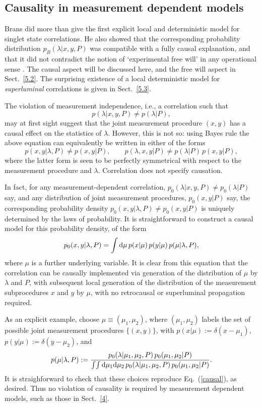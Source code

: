 \documentclass[graybox]{svmult}
\begin{document}
\subsection{Causality in measurement dependent models}
\label{5.1}

Brans did more than give the first explicit local and deterministic model for singlet state correlations.  He also showed that the corresponding probability distribution $p_B(\lambda|x,y,P)$ was compatible with a fully causal explanation, and that it did not contradict the notion of `experimental free will' in any operational sense \cite{brans}.  The causal aspect will be discussed here, and the free will aspect in Sect.~\ref{5.2}. The surprising existence of a local deterministic model for {\it superluminal} correlations is given in Sect.~\ref{5.3}.

The violation of measurement independence, i.e., a correlation such that
\[ p(\lambda|x,y,P)\neq p(\lambda|P), \]
may at first sight suggest that the joint measurement procedure $(x,y)$ has a causal effect on the statistics of $\lambda$.  However, this is not so: using Bayes rule the above equation can equivalently be written in either of the forms
\[ p(x,y|\lambda,P)\neq p(x,y|P),\qquad p(\lambda,x,y|P)\neq p(\lambda|P)\,p(x,y|P),  \]
where the latter form is seen to be perfectly symmetrical with respect to the measurement procedure and $\lambda$. Correlation does not specify causation.

In fact, for any measurement-dependent correlation, $p_0(\lambda|x,y,P)\neq p_0(\lambda|P)$ say, and any distribution of joint measurement procedures, $p_0(x,y|P)$ say, the corresponding probability density $p_0(x,y|\lambda,P)\neq p_0(x,y|P)$ is uniquely determined by the laws of probability. It is straightforward to construct a causal model for this probability density, of the form 
\begin{equation} \label{causal}
p_0(x,y|\lambda,P) = \int \D\mu \,p(x|\mu)\,p(y|\mu)\,p(\mu|\lambda,P) ,
\end{equation}
where $\mu$ is a further underlying variable.  It is clear from this equation that the correlation can be causally implemented via generation of the distribution of $\mu$ by $\lambda$ and $P$, with subsequent local generation of the distribution of the measurement subprocedures $x$ and $y$ by $\mu$, with no retrocausal or superluminal propagation required. 

As an explicit example, choose
$\mu\equiv (\mu_1,\mu_2)$, where $(\mu_1,\mu_2)$ labels the set of possible joint measurement procedures $\{(x,y)\}$, with $p(x|\mu):= \delta(x-\mu_1)$,  $p(y|\mu):=\delta(y-\mu_2)$, and
\begin{equation}   
p(\mu|\lambda,P):= \frac{p_0(\lambda|\mu_1,\mu_2,P)\,p_0(\mu_1,\mu_2|P)}{\int\!\int \mathrm{d} \mu_1 \mathrm{d} \mu_2 \, p_0(\lambda|\mu_1,\mu_2,P)\,p_0(\mu_1,\mu_2|P)} .
\end{equation}
It is straighforward to check that these choices reproduce Eq.~(\ref{causal}), as desired. Thus no violation of causality is required by measurement dependent models, such as those in Sect.~\ref{4}.
\end{document}
